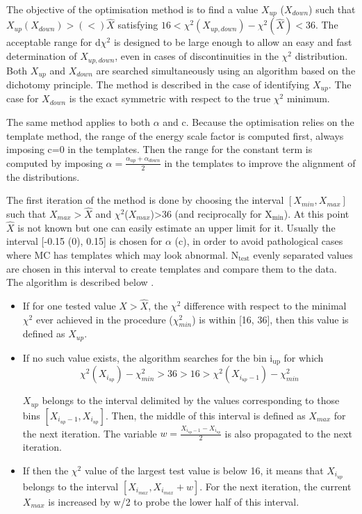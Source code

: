 The objective of the optimisation method is to find a value $X_{up}$ ($X_{down}$) such that $X_{up} (X_{down}) > (<) \hat{X}$ satisfying $16<\chi^2(X_{up,down})-\chi^2(\hat{X})<36$.
The acceptable range for d$\chi^2$ is designed to be large enough to allow an easy and fast determination of $X_{up,down}$, even in cases of discontinuities in the $\chi^2$ distribution.
Both $X_{up}$ and $X_{down}$ are searched simultaneously using an algorithm based on the dichotomy principle.
The method is described in the case of identifying $X_{up}$.
The case for $X_{down}$ is the exact symmetric with respect to the true $\chi^2$ minimum.

The same method applies to both \(\alpha\) and c.
Because the optimisation relies on the template method, the range of the energy scale factor is computed first, always imposing c=0 in the templates.
Then the range for the constant term is computed by imposing \(\alpha=\frac{\alpha_{up}+\alpha_{down}}{2}\) in the templates to improve the alignment of the distributions.

The first iteration of the method is done by choosing the interval $[X_{min}, X_{max}]$ such that \(X_{max}>\hat{X}\) and $\chi^2$($X_{max}$)>36 (and reciprocally for X\(_{\text{min}}\)).
At this point \(\hat{X}\) is not known but one can easily estimate an upper limit for it.
Usually the interval [-0.15 (0), 0.15] is chosen for \(\alpha\) (c), in order to avoid pathological cases where MC has templates which may look abnormal.
N\(_{\text{test}}\) evenly separated values are chosen in this interval to create templates and compare them to the data.
The algorithm is described below .

\begin{itemize}
\item If for one tested value $X>\hat{X}$, the $\chi^2$ difference with respect to the minimal $\chi^2$ ever achieved in the procedure ($\chi^2_{min}$) is within [16, 36], then this value is defined as $X_{up}$.

\item If no such value exists, the algorithm searches for the bin i\(_{\text{up}}\) for which
\begin{equation}
\chi^{2}(X_{i_{up}})-\chi^2_{min}>36>16>\chi^2(X_{i_{up}-1})-\chi^2_{min}
\end{equation}

$X_{up}$ belongs to the interval delimited by the values corresponding to those bins \([X_{i_{up}-1}, X_{i_{up}}]\).
Then, the middle of this interval is defined as $X_{max}$ for the next iteration.
The variable $w=\frac{X_{i_{up}-1}-X_{i_{up}}}{2}$ is also propagated to the next iteration.

\item If then the $\chi^2$ value of the largest test value is below 16, it means that $X_{i_{up}}$ belongs to the interval $[X_{i_{max}}, X_{i_{max}}+w]$.
For the next iteration, the current $X_{max}$ is increased by w/2 to probe the lower half of this interval.
\end{itemize}


